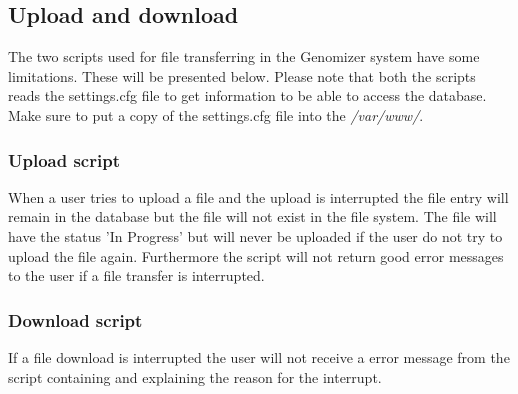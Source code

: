 \subsection{Upload and download}
The two scripts used for file transferring in the Genomizer system have some limitations. These will be presented below. Please note that both the scripts reads the settings.cfg file to get information to be able to access the database. Make sure to put a copy of the settings.cfg file into the \emph{/var/www/}.
\subsubsection{Upload script}
When a user tries to upload a file and the upload is interrupted the file entry will remain in the database but the file will not exist in the file system. The file will have the status 'In Progress' but will never be uploaded if the user do not try to upload the file again. Furthermore the script will not return good error messages to the user if a file transfer is interrupted. 
\subsubsection{Download script}
If a file download is interrupted the user will not receive a error message from the script containing and explaining the reason for the interrupt.
